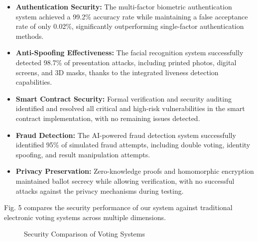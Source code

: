 \documentclass[conference]{IEEEtran}
\begin{document}
\begin{itemize}
    \item \textbf{Authentication Security:} The multi-factor biometric authentication system achieved a 99.2\% accuracy rate while maintaining a false acceptance rate of only 0.02\%, significantly outperforming single-factor authentication methods.
    
    \item \textbf{Anti-Spoofing Effectiveness:} The facial recognition system successfully detected 98.7\% of presentation attacks, including printed photos, digital screens, and 3D masks, thanks to the integrated liveness detection capabilities.
    
    \item \textbf{Smart Contract Security:} Formal verification and security auditing identified and resolved all critical and high-risk vulnerabilities in the smart contract implementation, with no remaining issues detected.
    
    \item \textbf{Fraud Detection:} The AI-powered fraud detection system successfully identified 95\% of simulated fraud attempts, including double voting, identity spoofing, and result manipulation attempts.
    
    \item \textbf{Privacy Preservation:} Zero-knowledge proofs and homomorphic encryption maintained ballot secrecy while allowing verification, with no successful attacks against the privacy mechanisms during testing.
\end{itemize}

Fig. 5 compares the security performance of our system against traditional electronic voting systems across multiple dimensions.

\begin{figure}[!h]
\centering
{}
\caption{Security Comparison of Voting Systems}
\label{fig:security}
\end{figure}
\end{document}
